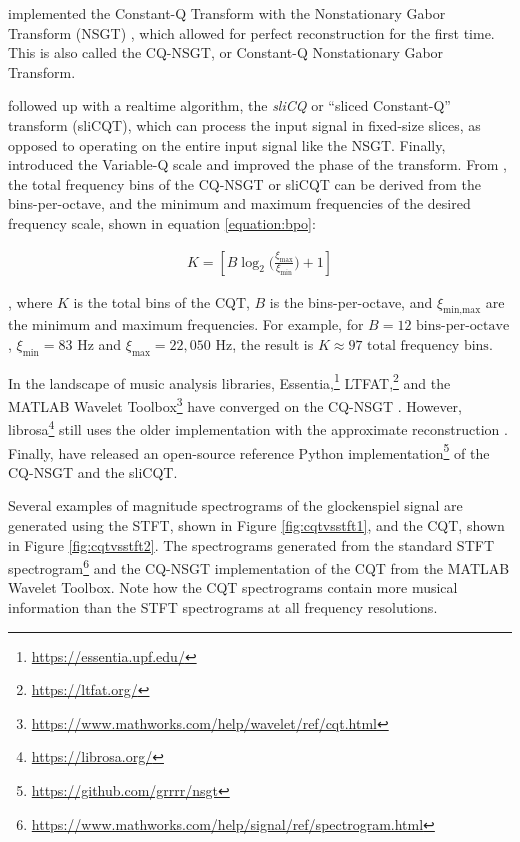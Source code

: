 \documentclass[report.tex]{subfiles}
\begin{document}
\textcite{invertiblecqt} implemented the Constant-Q Transform with the Nonstationary Gabor Transform (NSGT) \parencite{balazs}, which allowed for perfect reconstruction for the first time. This is also called the CQ-NSGT, or Constant-Q Nonstationary Gabor Transform.

\textcite{slicq} followed up with a realtime algorithm, the \textit{sliCQ} or ``sliced Constant-Q'' transform (sliCQT), which can process the input signal in fixed-size slices, as opposed to operating on the entire input signal like the NSGT. Finally, \textcite{variableq1} introduced the Variable-Q scale and improved the phase of the transform. From \textcite{invertiblecqt}, the total frequency bins of the CQ-NSGT or sliCQT can be derived from the bins-per-octave, and the minimum and maximum frequencies of the desired frequency scale, shown in equation \ref{equation:bpo}:

\begin{align}
	K = [B \log_{2}\big(\frac{\xi_{\text{max}}}{\xi_{\text{min}}}\big) + 1]\tag{10}\label{equation:bpo}
\end{align}

, where $K$ is the total bins of the CQT, $B$ is the bins-per-octave, and $\xi_{\text{min,max}}$ are the minimum and maximum frequencies. For example, for $B = 12 \text{ bins-per-octave}$, $\xi_{\text{min}} = 83 \text{ Hz}$ and $\xi_{\text{max}} = 22{,}050 \text{ Hz}$, the result is $K \approx 97 \text{ total frequency bins}$.

In the landscape of music analysis libraries, Essentia,\footnote{\url{https://essentia.upf.edu/}} LTFAT,\footnote{\url{https://ltfat.org/}} and the MATLAB Wavelet Toolbox\footnote{\url{https://www.mathworks.com/help/wavelet/ref/cqt.html}} have converged on the CQ-NSGT \parencite{invertiblecqt, slicq, variableq1}. However, librosa\footnote{\url{https://librosa.org/}} still uses the older implementation with the approximate reconstruction \parencite{klapuricqt}. Finally, \textcite{invertiblecqt} have released an open-source reference Python implementation\footnote{\url{https://github.com/grrrr/nsgt}} of the CQ-NSGT and the sliCQT.

Several examples of magnitude spectrograms of the glockenspiel signal are generated using the STFT, shown in Figure \ref{fig:cqtvsstft1}, and the CQT, shown in Figure \ref{fig:cqtvsstft2}. The spectrograms generated from the standard STFT spectrogram\footnote{\url{https://www.mathworks.com/help/signal/ref/spectrogram.html}} and the CQ-NSGT implementation of the CQT from the MATLAB Wavelet Toolbox. Note how the CQT spectrograms contain more musical information than the STFT spectrograms at all frequency resolutions.
\end{document}
